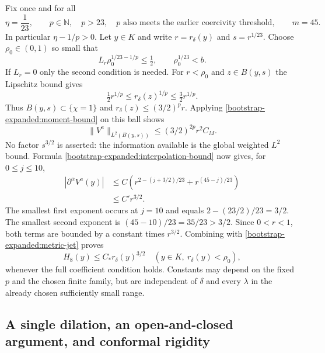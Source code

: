 \documentclass[11pt]{article}
\theoremstyle{definition}
\theoremstyle{remark}
\numberwithin{equation}{section}
\begin{document}
Fix once and for all
\begin{equation}
 \eta=\frac1{23},\qquad
 p\in\mathbb N,\quad p>23,
 \quad p\text{ also meets the earlier coercivity threshold},
 \qquad m=45.
 \label{bootstrap-expanded:exponents}
\end{equation}
In particular $\eta-1/p>0$.  Let $y\in K$ and write
$r=r_\delta(y)$ and $s=r^{1/23}$.  Choose $\rho_0\in(0,1)$ so
small that
\[
 L_r\rho_0^{1/23-1/p}\leq\tfrac12,
 \qquad \rho_0^{1/23}<b.
\]
If $L_r=0$ only the second condition is needed.  For $r<\rho_0$
and $z\in B(y,s)$ the Lipschitz bound gives
\[
 \tfrac12r^{1/p}\leq r_\delta(z)^{1/p}
                       \leq\tfrac32r^{1/p}.
\]
Thus $B(y,s)\subset\{\chi=1\}$ and
$r_\delta(z)\leq(3/2)^p r$.  Applying
\eqref{bootstrap-expanded:moment-bound} on this ball shows
\[
 \|V^a\|_{L^2(B(y,s))}
       \leq(3/2)^{2p}r^2 C_M.
\]
No factor $s^{3/2}$ is asserted: the information available is the
global weighted $L^2$ bound.  Formula
\eqref{bootstrap-expanded:interpolation-bound} now gives, for $0\leq j\leq10$,
\begin{align*}
 |\partial^\alpha V^a(y)|
 &\leq C\left(r^{2-(j+3/2)/23}+r^{(45-j)/23}\right)\\
 &\leq C' r^{3/2}.
\end{align*}
The smallest first exponent occurs at $j=10$ and equals
$2-(23/2)/23=3/2$.  The smallest second exponent is
$(45-10)/23=35/23>3/2$.  Since $0<r<1$, both terms are bounded
by a constant times $r^{3/2}$.  Combining with
\eqref{bootstrap-expanded:metric-jet} proves
\begin{equation}
 H_8(y)\leq C_*r_\delta(y)^{3/2}
 \quad(y\in K,\ r_\delta(y)<\rho_0),
 \label{bootstrap-expanded:superlinear}
\end{equation}
whenever the full coefficient condition holds.  Constants may depend
on the fixed $p$ and the chosen finite family, but are independent of
$\delta$ and every $\lambda$ in the already chosen sufficiently small
range.

\subsection{A single dilation, an open-and-closed argument, and conformal rigidity}
\label{bootstrap-expanded:closure}
\end{document}
